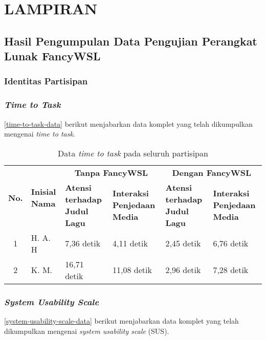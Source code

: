 \chapter*{LAMPIRAN}

\section{Hasil Pengumpulan Data Pengujian Perangkat Lunak FancyWSL}

\subsection{Identitas Partisipan}

\subsection{\textit{Time to Task}}

\autoref{time-to-task-data} berikut menjabarkan data komplet yang telah dikumpulkan mengenai \textit{time to task}.

\begin{table}[h]
    \centering
    \caption{Data \textit{time to task} pada seluruh partisipan}
    \label{time-to-task-data}
    \begin{tabularx}{\linewidth}{|c|X|X|X|X|X|} \hline
        \multirow{2}{*}{\textbf{No.}} & \multirow{2}{*}{\textbf{Inisial Nama}} & \multicolumn{2}{c|}{\textbf{Tanpa FancyWSL}} & \multicolumn{2}{c|}{\textbf{Dengan FancyWSL}}\\ \cline{3-6}
        & & \textbf{Atensi terhadap Judul Lagu} & \textbf{Interaksi Penjedaan Media} & \textbf{Atensi terhadap Judul Lagu} & \textbf{Interaksi Penjedaan Media}\\ \hline
        1 & H. A. H & 7,36 detik & 4,11 detik & 2,45 detik & 6,76 detik\\ \hline
        2 & K. M. & 16,71 detik & 11,08 detik & 2,96 detik & 7,28 detik\\ \hline
    \end{tabularx}
\end{table}

\subsection{\textit{System Usability Scale}}

\autoref{system-usability-scale-data} berikut menjabarkan data komplet yang telah dikumpulkan mengenai \textit{system usability scale} (SUS).

